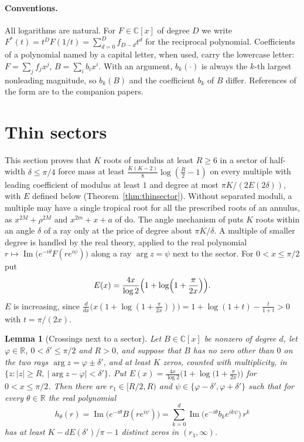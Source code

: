 \documentclass[11pt]{article}
\newtheorem{lemma}[theorem]{Lemma}
\newcommand{\R}{\mathbb R}
\begin{document}
\paragraph{Conventions.}
All logarithms are natural.  For $F\in\mathbb C[x]$ of degree $D$ we write
$F^*(t)=t^DF(1/t)=\sum_{d=0}^Df_{D-d}t^d$ for the reciprocal polynomial.
Coefficients of a polynomial named by a capital letter, when used, carry the
lowercase letter: $F=\sum_jf_jx^j$, $B=\sum_ib_ix^i$.  With an argument,
$b_k(\cdot)$ is always the $k$-th largest nonleading magnitude, so $b_k(B)$
and the coefficient $b_k$ of $B$ differ.
References of the form \cite[Theorem~3.2]{coefficient-mass} are to the
companion papers.

\section{Thin sectors}\label{sec:thin}

This section proves that $K$ roots of modulus at least $R\ge6$ in a sector
of half-width $\delta\le\pi/4$ force mass at least
$\frac{K(K-2)}8\log(\frac R2-1)$ on every multiple with leading coefficient
of modulus at least $1$ and degree at most $\pi K/(2E(2\delta))$, with $E$
defined below (Theorem~\ref{thm:thinsector}).  Without separated moduli, a multiple may have a single tropical root
\cite[Theorem~3.3]{coefficient-mass-complex} for all the prescribed roots of an annulus, as $x^{2M}+\rho^{2M}$ and
$x^{2m}+x+a$ of \cite[Proposition~3.2]{coefficient-mass-complex} do.  The angle mechanism of
\cite[Proposition~3.2]{coefficient-mass-complex} puts $K$ roots within an angle $\delta$ of a
ray only at the price of degree about $\pi K/\delta$.  A multiple of smaller
degree is handled by the real theory, applied to the real polynomial
$r\mapsto\operatorname{Im}\bigl(e^{-i\theta}F(re^{i\psi})\bigr)$ along a ray
$\arg z=\psi$ next to the sector.  For $0<x\le\pi/2$ put
\[
  E(x)=\frac{4x}{\log2}\Bigl(1+\log\Bigl(1+\frac{\pi}{2x}\Bigr)\Bigr).
\]
$E$ is increasing, since
$\frac{d}{dx}\bigl(x(1+\log(1+\frac{\pi}{2x}))\bigr)=1+\log(1+t)-\frac t{1+t}>0$
with $t=\pi/(2x)$.

\begin{lemma}[Crossings next to a sector]\label{lem:sectorcount}
Let $B\in\mathbb C[x]$ be nonzero of degree $d$, let $\varphi\in\R$,
$0<\delta'\le\pi/2$ and $R>0$, and suppose that $B$ has no zero other than $0$
on the two rays $\arg z=\varphi\pm\delta'$, and at least $K$ zeros, counted
with multiplicity, in $\{z:|z|\ge R,\ |\arg z-\varphi|<\delta'\}$.  Put
$E(x)=\frac{4x}{\log2}\bigl(1+\log\bigl(1+\frac{\pi}{2x}\bigr)\bigr)$ for
$0<x\le\pi/2$.  Then there are
$r_1\in[R/2,R)$ and $\psi\in\{\varphi-\delta',\varphi+\delta'\}$ such that for
every $\theta\in\R$ the real polynomial
\[
  h_\theta(r)=\operatorname{Im}\bigl(e^{-i\theta}B(re^{i\psi})\bigr)
  =\sum_{k=0}^d\operatorname{Im}\bigl(e^{-i\theta}b_ke^{ik\psi}\bigr)\,r^k
\]
has at least $K-dE(\delta')/\pi-1$ distinct zeros in $(r_1,\infty)$.
\end{lemma}
\end{document}
